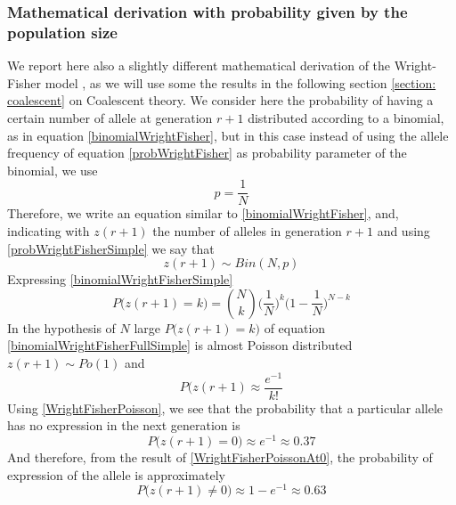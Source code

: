 \documentclass[12pt,mythesisstyle]{report}
\begin{document}
\subsubsection{Mathematical derivation with probability given by the population size \cite{coalescentPrimer}}
We report here also a slightly different mathematical derivation of the Wright-Fisher model \cite{coalescentPrimer}, as we will use some the results in the following section \ref{section: coalescent} on Coalescent theory. We consider here the probability of having a certain number of allele at generation $r+1$ distributed according to a binomial, as in equation \eqref{binomialWrightFisher}, but in this case instead of using the allele frequency of equation \eqref{probWrightFisher} as probability parameter of the binomial, we use
\begin{equation}\label{probWrightFisherSimple}
p=\frac{1}{N}
\end{equation}
Therefore, we write an equation similar to \eqref{binomialWrightFisher}, and, indicating with $z(r+1)$ the number of alleles in generation $r+1$ and using \eqref{probWrightFisherSimple} we say that
\begin{equation}\label{binomialWrightFisherSimple}
z(r+1) \sim Bin(N,p)
\end{equation}
Expressing \eqref{binomialWrightFisherSimple} 
\begin{equation}\label{binomialWrightFisherFullSimple}
P\big(z(r+1)=k\big)=\binom{N}{k}\bigg(\frac{1}{N}\bigg)^k\bigg(1-\frac{1}{N}\bigg)^{N-k}
\end{equation}
In the hypothesis of $N$ large $P\big(z(r+1)=k\big)$ of equation \eqref{binomialWrightFisherFullSimple} is almost Poisson distributed $z(r+1) \sim Po(1)$ and \cite{coalescentPrimer}
\begin{equation}\label{WrightFisherPoisson}
P\big(z(r+1) \approx \frac{e^{-1}}{k!}
\end{equation}
Using \eqref{WrightFisherPoisson}, we see that the probability that a particular allele has no expression in the next generation is
\begin{equation}\label{WrightFisherPoissonAt0}
P\big(z(r+1)=0\big) \approx e^{-1} \approx 0.37
\end{equation}
And therefore, from the result of \eqref{WrightFisherPoissonAt0}, the probability of expression of the allele is approximately
\begin{equation}\label{WrightFisherPoissonAtNot0}
P\big(z(r+1) \neq 0\big) \approx 1- e^{-1} \approx 0.63
\end{equation}
\end{document}
